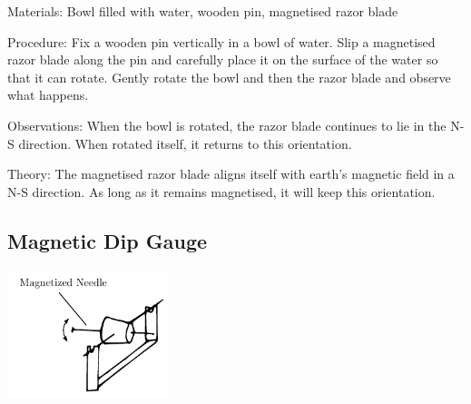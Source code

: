 \begin{multicols}{2}
\begin{description*}
\item[Materials:]{Bowl filled with water, wooden pin, magnetised razor blade}
\item[Procedure:]{Fix a wooden pin vertically in a bowl of water. Slip a magnetised razor blade along the pin and carefully place it on the surface of the water so that it can rotate. Gently rotate the bowl and then the razor blade and observe what happens.}
\item[Observations:]{When the bowl is rotated, the razor blade continues to lie in the N-S direction. When rotated itself, it returns to this orientation.}
\item[Theory:]{The magnetised razor blade aligns itself with earth's magnetic field in a N-S direction. As long as it remains magnetised, it will keep this orientation.}
\end{description*}

\subsection{Magnetic Dip Gauge}

\begin{center}
\includegraphics[width=0.35\textwidth]{./img/magnetic-dip-gauge.png}
\end{center}


\end{multicols}
